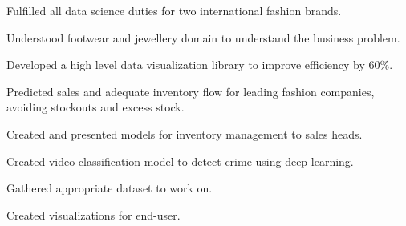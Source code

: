 \documentclass[]{puneet-resume}
\begin{document}
\begin{minipage}[t]{0.66\textwidth}
 
\noindent
\hspace{2.8em}%
\begin{minipage}{0.85\textwidth\vspace{2pt}}
\begin{tightemize}
	\item[] 
	\item Fulfilled all data science duties for two international fashion brands.
	\item Understood footwear and jewellery domain to understand the business problem.
	\item Developed a high level data visualization library to improve efficiency by 60\%.
	\item Predicted sales and adequate inventory flow for leading fashion companies, avoiding stockouts and excess stock.
	\item Created and presented models for inventory management to sales heads.
\end{tightemize}
\end{minipage}
\sectionsep

 
\noindent
\hspace{2.8em}%
\begin{minipage}{0.85\textwidth\vspace{2pt}}
\begin{tightemize}
	\item Created video classification model to detect crime using deep learning.
	\item Gathered appropriate dataset to work on.
	\item Created visualizations for end-user.
\end{tightemize}
\end{minipage}
\sectionsep

\end{minipage}
\end{document}
